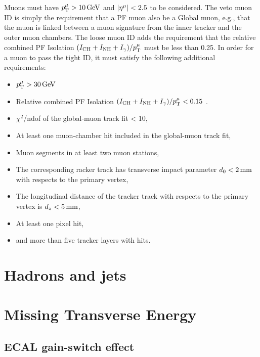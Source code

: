 Muons must have $p_{\mathrm{T}}^{{\mu}} > 10\,\text{Ge\hspace{-.08em}V}$ and $\lvert \eta^{{\mu}} \rvert < 2.5$ to be considered.
The veto muon ID is simply the requirement that a PF muon also be a Global muon, e.g., that the muon is linked between a muon signature from the inner tracker and the outer muon chambers.
The loose muon ID adds the requirement that the relative combined PF Isolation $(I_{\text{CH}} + I_{\text{NH}} + I_{\gamma}) / p_{\mathrm{T}}^{{\mu}}$ must be less than 0.25.
In order for a muon to pass the tight ID, it must satisfy the following additional requirements:
\begin{itemize}
   \item $p_{\mathrm{T}}^{{\mu}} > 30\,\text{Ge\hspace{-.08em}V}$
   \item Relative combined PF Isolation $(I_{\text{CH}} + I_{\text{NH}} + I_{\gamma}) / p_{\mathrm{T}}^{{\mu}} < 0.15$ . 
   \item $\chi^2$/ndof of the global-muon track fit < 10,
   \item At least one muon-chamber hit included in the global-muon track fit,
   \item Muon segments in at least two muon stations,
   \item The corresponding racker track has transverse impact parameter $d_0 < 2\,\text{mm}$ with respects to the primary vertex,
   \item The longitudinal distance of the tracker track with respects to the primary vertex is $d_z < 5\,\text{mm}$,
   \item At least one pixel hit,
   \item and more than five tracker layers with hits.

\end{itemize}

\section{Hadrons and jets}
\label{sec:jets}


\section{Missing Transverse Energy}
\label{sec:met}

\subsection{ECAL gain-switch effect}
\label{subsec:gainswitch}

